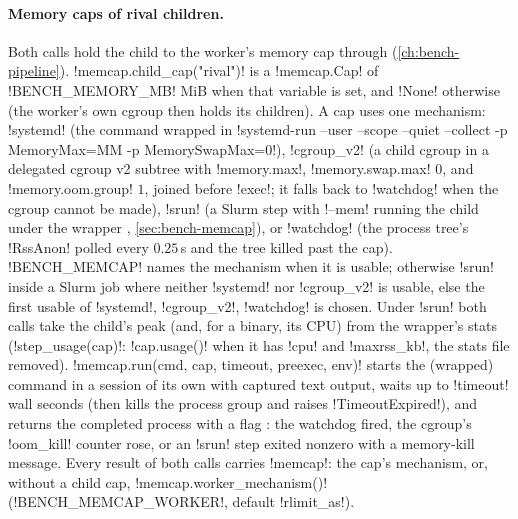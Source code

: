 \paragraph{Memory caps of rival children.} Both calls hold the child to the worker's memory cap through  (\cref{ch:bench-pipeline}). \py!memcap.child_cap("rival")! is a \py!memcap.Cap! of \code!BENCH_MEMORY_MB! MiB when that variable is set, and \py!None! otherwise (the worker's own cgroup then holds its children). A cap uses one mechanism: \code!systemd! (the command wrapped in \code!systemd-run --user --scope --quiet --collect -p MemoryMax=MM -p MemorySwapMax=0!), \code!cgroup_v2! (a child cgroup in a delegated cgroup v2 subtree with \code!memory.max!, \code!memory.swap.max! $0$, and \code!memory.oom.group! $1$, joined before \code!exec!; it falls back to \code!watchdog! when the cgroup cannot be made), \code!srun! (a Slurm step with \code!--mem! running the child under the wrapper , \cref{sec:bench-memcap}), or \code!watchdog! (the process tree's \code!RssAnon! polled every $0.25$\,s and the tree killed past the cap). \code!BENCH_MEMCAP! names the mechanism when it is usable; otherwise \code!srun! inside a Slurm job where neither \code!systemd! nor \code!cgroup_v2! is usable, else the first usable of \code!systemd!, \code!cgroup_v2!, \code!watchdog! is chosen. Under \code!srun! both calls take the child's peak (and, for a binary, its CPU) from the wrapper's stats (\py!step_usage(cap)!: \py!cap.usage()! when it has \code!cpu! and \code!maxrss_kb!, the stats file removed). \py!memcap.run(cmd, cap, timeout, preexec, env)! starts the (wrapped) command in a session of its own with captured text output, waits up to \py!timeout! wall seconds (then kills the process group and raises \py!TimeoutExpired!), and returns the completed process with a flag : the watchdog fired, the cgroup's \code!oom_kill! counter rose, or an \code!srun! step exited nonzero with a memory-kill message. Every result of both calls carries \code!memcap!: the cap's mechanism, or, without a child cap, \py!memcap.worker_mechanism()! (\code!BENCH_MEMCAP_WORKER!, default \code!rlimit_as!).

